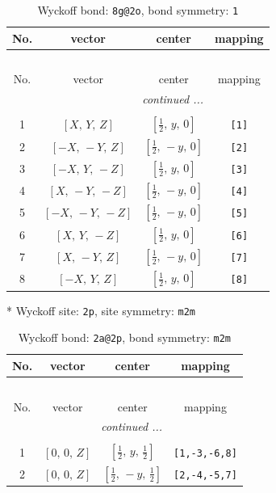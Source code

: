 \documentclass[fleqn,8pt]{jsarticle}
\begin{document}
\begin{longtable}{cccc}
\caption{Wyckoff bond: {\tt 8g@2o}, bond symmetry: {\tt 1}}
 \\
 \hline \hline
No. & vector & center & mapping \\ \hline \endfirsthead

\multicolumn{3}{l}{\tablename\ \thetable{}} \\
 \hline \hline
No. & vector & center & mapping \\ \hline \endhead

 \hline \hline
\multicolumn{3}{r}{\footnotesize\it continued ...} \\ \endfoot

 \hline \hline
\multicolumn{3}{r}{} \\ \endlastfoot

1 & $\left[ X,\, Y,\, Z \right]$ & $\left[ \frac{1}{2},\, y,\, 0 \right]$ & {\tt [1]} \\ \hline
2 & $\left[ - X,\, - Y,\, Z \right]$ & $\left[ \frac{1}{2},\, - y,\, 0 \right]$ & {\tt [2]} \\ \hline
3 & $\left[ - X,\, Y,\, - Z \right]$ & $\left[ \frac{1}{2},\, y,\, 0 \right]$ & {\tt [3]} \\ \hline
4 & $\left[ X,\, - Y,\, - Z \right]$ & $\left[ \frac{1}{2},\, - y,\, 0 \right]$ & {\tt [4]} \\ \hline
5 & $\left[ - X,\, - Y,\, - Z \right]$ & $\left[ \frac{1}{2},\, - y,\, 0 \right]$ & {\tt [5]} \\ \hline
6 & $\left[ X,\, Y,\, - Z \right]$ & $\left[ \frac{1}{2},\, y,\, 0 \right]$ & {\tt [6]} \\ \hline
7 & $\left[ X,\, - Y,\, Z \right]$ & $\left[ \frac{1}{2},\, - y,\, 0 \right]$ & {\tt [7]} \\ \hline
8 & $\left[ - X,\, Y,\, Z \right]$ & $\left[ \frac{1}{2},\, y,\, 0 \right]$ & {\tt [8]} \\
\end{longtable}
* Wyckoff site: {\tt 2p}, site symmetry: {\tt m2m}
\renewcommand{\arraystretch}{1.2}
\begin{longtable}{cccc}
\caption{Wyckoff bond: {\tt 2a@2p}, bond symmetry: {\tt m2m}}
 \\
 \hline \hline
No. & vector & center & mapping \\ \hline \endfirsthead

\multicolumn{3}{l}{\tablename\ \thetable{}} \\
 \hline \hline
No. & vector & center & mapping \\ \hline \endhead

 \hline \hline
\multicolumn{3}{r}{\footnotesize\it continued ...} \\ \endfoot

 \hline \hline
\multicolumn{3}{r}{} \\ \endlastfoot

1 & $\left[ 0,\, 0,\, Z \right]$ & $\left[ \frac{1}{2},\, y,\, \frac{1}{2} \right]$ & {\tt [1,-3,-6,8]} \\ \hline
2 & $\left[ 0,\, 0,\, Z \right]$ & $\left[ \frac{1}{2},\, - y,\, \frac{1}{2} \right]$ & {\tt [2,-4,-5,7]} \\
\end{longtable}
\end{document}
